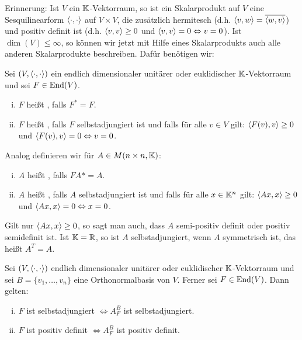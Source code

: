 Erinnerung: Ist $V$ ein $\mathbb{K}$-Vektorraum, so ist ein Skalarprodukt auf $V$ eine Sesquilinearform $\left\langle\cdot,\cdot\right\rangle$ auf $V \times V$, die zusätzlich hermitesch (d.h. $\left\langle v,w\right\rangle = \overline{\left\langle w,v\right\rangle}$) und positiv definit ist (d.h. $\left\langle v,v\right\rangle \geq 0$ und $\left\langle v,v\right\rangle = 0 \Leftrightarrow v = 0$).
Ist $\dim(V) \leq \infty$, so können wir jetzt mit Hilfe eines Skalarprodukts auch alle anderen Skalarprodukte beschreiben.
Dafür benötigen wir:

\begin{definition}
	\label{def:5.8}
	Sei $(V,\left\langle\cdot,\cdot\right\rangle)$ ein endlich dimensionaler unitärer oder euklidischer $\mathbb{K}$-Vektorraum und sei $F \in \operatorname{End}(V)$.
	\begin{enumerate}[(i)]
		\item $F$ heißt , falls $F^* = F$.
		\item $F$ heißt , falls $F$ selbstadjungiert ist und falls für alle $v \in V$ gilt: $\left\langle F(v),v\right\rangle \geq 0$ und $\left\langle F(v),v\right\rangle = 0 \Leftrightarrow v = 0$.
	\end{enumerate}
	
	Analog definieren wir für $A \in M(n \times n, \mathbb{K})$:
	\begin{enumerate}[(i)]
		\item $A$ heißt , falls $FA* = A$.
		\item $A$ heißt , falls $A$ selbstadjungiert ist und falls für alle $x \in \mathbb{K}^n$ gilt: $\left\langle Ax,x\right\rangle \geq 0$ und $\left\langle Ax,x\right\rangle = 0 \Leftrightarrow x = 0$.
	\end{enumerate}
	
	Gilt nur $\left\langle Ax,x\right\rangle \geq 0$, so sagt man auch, dass $A$ semi-positiv definit oder positiv semidefinit ist.
	Ist $\mathbb{K}= \mathbb{R}$, so ist $A$ selbstadjungiert, wenn $A$ symmetrisch ist, das heißt $A^T = A$.
\end{definition}

\begin{lemma}
	\label{lemma:5.9}
	Sei $(V,\left\langle\cdot,\cdot\right\rangle)$ endlich dimensionaler unitärer oder euklidischer $\mathbb{K}$-Vektorraum und sei $B = \{v_1,\dots,v_n\}$ eine Orthonormalbasis von $V$.
	Ferner sei $F \in \operatorname{End}(V)$.
	Dann gelten:
	\begin{enumerate}[(i)]
		\item $F$ ist selbstadjungiert $\Leftrightarrow A^B_F$ ist selbstadjungiert.
		\item $F$ ist positiv definit $\Leftrightarrow A^B_F$ ist positiv definit.
	\end{enumerate}
\end{lemma}

